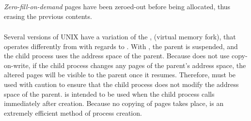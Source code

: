 \begin{definition}\label{def:Zero_Fill_on_Demand}
  \emph{Zero-fill-on-demand} pages have been zeroed-out before being allocated, thus erasing the previous contents.
\end{definition}

\subsubsection{\texorpdfstring{}{\texttt{vfork()}}}\label{subsubsec:vfork}
Several versions of UNIX have a variation of the  ,  (virtual memory fork), that operates differently from  with regards to .
With , the parent  is suspended, and the child process uses the address space of the parent.
Because  does not use copy-on-write, if the child process changes any pages of the parent’s address space, the altered pages will be visible to the parent once it resumes.
Therefore,  must be used with caution to ensure that the child process does not modify the address space of the parent.
 is intended to be used when the child process calls  immediately after creation.
Because no copying of pages takes place,  is an extremely efficient method of process creation.

